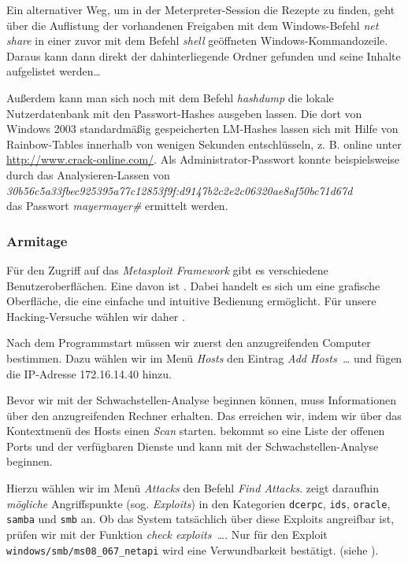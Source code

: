 Ein alternativer Weg, um in der Meterpreter-Session die Rezepte zu finden, geht
über die Auflistung der vorhandenen Freigaben mit dem Windows-Befehl \emph{net
  share} in einer zuvor mit dem Befehl \emph{shell} geöffneten
Windows-Kommandozeile. Daraus kann dann direkt der dahinterliegende Ordner
gefunden und seine Inhalte aufgelistet werden\ldots



Außerdem kann man sich noch mit dem Befehl \emph{hashdump} die lokale
Nutzerdatenbank mit den Passwort-Hashes ausgeben lassen. Die dort von Windows
2003 standardmäßig gespeicherten LM-Hashes lassen sich mit Hilfe von
Rainbow-Tables innerhalb von wenigen Sekunden entschlüsseln, z. B. online unter
\url{http://www.crack-online.com/}. Als Administrator-Passwort konnte
beispielsweise durch das Analysieren-Lassen
von\\ \emph{30b56c5a33fbec925395a77c12853f9f:d9147b2c2e2c06320ae8af50bc71d67d}\\ das
Passwort \emph{mayermayer\#} ermittelt werden.



\subsubsection{Armitage}

Für den Zugriff auf das \emph{Metasploit Framework} gibt es verschiedene
Benutzeroberflächen.  Eine davon ist \Armitage{}. Dabei handelt es sich um eine
grafische Oberfläche, die eine einfache und intuitive Bedienung ermöglicht. Für
unsere Hacking-Versuche wählen wir daher \Armitage.

Nach dem Programmstart müssen wir zuerst den anzugreifenden Computer
bestimmen. Dazu wählen wir im Menü \emph{Hosts} den Eintrag \emph{\glqq{}Add
  Hosts~\dots{}\grqq{}} und fügen die IP-Adresse 172.16.14.40 hinzu.

Bevor wir mit der Schwachstellen-Analyse beginnen können, muss \Armitage{}
Informationen über den anzugreifenden Rechner erhalten. Das erreichen wir, indem
wir über das Kontextmenü des Hosts einen \emph{Scan} starten. \Armitage{}
bekommt so eine Liste der offenen Ports und der verfügbaren Dienste und kann mit
der Schwachstellen-Analyse beginnen.

Hierzu wählen wir im Menü \emph{Attacks} den Befehl \emph{\glqq{}Find
  Attacks\grqq{}}. \Armitage{} zeigt daraufhin \emph{mögliche} Angriffspunkte
(sog. \emph{Exploits}) in den Kategorien \texttt{dcerpc}, \texttt{ids},
\texttt{oracle}, \texttt{samba} und \texttt{smb} an. Ob das System tatsächlich
über diese Exploits angreifbar ist, prüfen wir mit der Funktion
\emph{\glqq{}check exploits~\dots\grqq{}}. Nur für den Exploit
\texttt{windows/smb/ms08\_067\_netapi} wird eine Verwundbarkeit
bestätigt. (siehe ).


